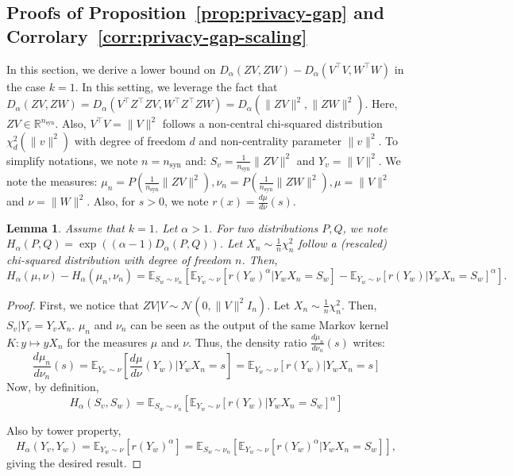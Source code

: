 \documentclass{article}
\theoremstyle{plain}
\newtheorem{lemma}{Lemma}[section]
\theoremstyle{definition}
\theoremstyle{remark}
\begin{document}
\subsection{Proofs of Proposition~\ref{prop:privacy-gap} and Corrolary~\ref{corr:privacy-gap-scaling}}
In this section, we derive a lower bound on $D_\alpha(ZV,ZW) - D_\alpha(V^\top V, W^\top W)$ in the case $k=1$. In this setting, we leverage the fact that $D_\alpha(ZV,ZW) = D_\alpha(V^\top Z^\top Z V, W^\top Z^\top Z W) = D_\alpha(\|ZV\|^2,\|ZW\|^2)$.
Here, $ZV \in \mathbb{R}^{n_{\text{syn}}}$. Also, $V^\top V = \|V\|^2$ follows a non-central chi-squared distribution $\chi_d^2(\|v\|^2)$ with degree of freedom $d$ and non-centrality parameter $\|v\|^2$. To simplify notations, we note $n=n_{\text{syn}}$ and: $S_v = \frac{1}{n_{\text{syn}}}\|ZV\|^2$ and $Y_v = \|V\|^2$. We note the measures: $\mu_n = P\left(\frac{1}{n_{\text{syn}}}\|ZV\|^2\right), \nu_n = P\left(\frac{1}{n_{\text{syn}}}\|ZW\|^2\right), \mu = \|V\|^2$ and $ \nu = \|W\|^2$. Also, for $s > 0$, we note $r(x) = \frac{d\mu}{d\nu}(s)$.

\begin{lemma}
    Assume that $k=1$. Let $\alpha > 1$. For two distributions $P, Q$, we note $H_\alpha(P,Q) = \exp((\alpha-1)D_\alpha(P,Q))$. Let $X_n \sim \frac{1}{n}\chi_{n}^2$ follow a (rescaled) chi-squared distribution with degree of freedom $n$. Then,
    \[H_\alpha(\mu, \nu) - H_\alpha(\mu_n, \nu_n) = \mathbb{E}_{S_w\sim \nu_n}\left[\mathbb{E}_{Y_w \sim \nu}[r(Y_w)^\alpha | Y_wX_n = S_w] - \mathbb{E}_{Y_w \sim \nu}\left[r(Y_w) \big| Y_wX_n = S_w \right]^\alpha\right].\]
\end{lemma}

\begin{proof}
    First, we notice that  $ZV | V \sim \mathcal{N}(0,\|V\|^2 I_{n})$. Let $X_n \sim \frac{1}{n}\chi_{n}^2$. Then, $S_v | Y_v = Y_v X_n$. $\mu_n$ and $\nu_n$ can be seen as the output of the same Markov kernel $K : y \mapsto yX_n$ for the measures $\mu$ and $\nu$. Thus, the density ratio $\frac{d\mu_{n}}{d\nu_{n}}(s)$ writes:
    \[\frac{d\mu_{n}}{d\nu_{n}}(s) = \mathbb{E}_{Y_w \sim\nu}\left[\frac{d\mu}{d\nu}(Y_w) \big| Y_wX_n = s \right] = \mathbb{E}_{Y_w \sim \nu}\left[r(Y_w) \big| Y_wX_n = s \right]\]
    Now, by definition,
    \[H_\alpha(S_v,S_w) = \mathbb{E}_{S_w \sim \nu_n}\left[\mathbb{E}_{Y_w \sim \nu}\left[r(Y_w) \big| Y_wX_n = S_w \right]^\alpha\right]\]
    
    Also by tower property, \[H_\alpha(Y_v,Y_w) = \mathbb{E}_{Y_w \sim \nu}\left[r(Y_w)^\alpha\right] = \mathbb{E}_{S_w \sim \nu_n}\left[\mathbb{E}_{Y_w \sim \nu}\left[r(Y_w)^\alpha \big| Y_wX_n = S_w \right]\right],\]
    giving the desired result.
    \end{proof}
\end{document}
